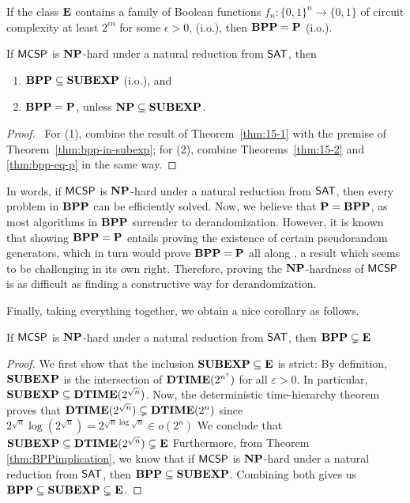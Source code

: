 \documentclass[11pt]{article}
\begin{document}
\begin{theorem}
  \label{thm:bpp-eq-p}
	If the class $\mathbf{E}$ contains a family of Boolean functions $f_n: \{0, 1\}^n \rightarrow \{0, 1\}$ of circuit complexity at least $2^{\epsilon n}$ for some $\epsilon > 0$, (i.o.), then $\mathbf{BPP} = \mathbf{P}$ (i.o.).
\end{theorem}

\begin{theorem}[\cite{10.1145/335305.335314}]
	\label{thm:BPPimplication}
	If $\mathsf{MCSP}$ is $\mathbf{NP}$-hard under a natural reduction from $\mathsf{SAT}$, then
	\begin{enumerate} [1.]
		\item $\mathbf{BPP} \subseteq \mathbf{SUBEXP}$ (i.o.), and
		\item $\mathbf{BPP} = \mathbf{P}$, unless $\mathbf{NP} \subseteq \mathbf{SUBEXP}$.
	\end{enumerate}
\end{theorem}

\begin{proof} \
  For (1), combine the result of Theorem~\ref{thm:15-1} with the premise of
  Theorem~\ref{thm:bpp-in-subexp};
  for (2), combine Theorems~\ref{thm:15-2} and \ref{thm:bpp-eq-p} in the same
  way.
\end{proof}

In words, if $\mathsf{MCSP}$ is $\mathbf{NP}$-hard under a natural reduction from
$\mathsf{SAT}$, then every problem in $\mathbf{BPP}$ can be efficiently solved.
Now, we believe that $\mathbf{P} = \mathbf{BPP}$, as most algorithms in $\mathbf{BPP}$ surrender
to derandomization.
However, it is known that showing $\mathbf{BPP} = \mathbf{P}$ entails proving the existence
of certain pseudorandom generators, which in turn would prove $\mathbf{BPP} = \mathbf{P}$ all
along \cite{goldreich11},
a result which seems to be challenging in its own right.
Therefore, proving the $\mathbf{NP}$-hardness of $\mathsf{MCSP}$ is as difficult
as finding a constructive way for derandomization.

Finally, taking everything together, we obtain a nice corollary as follows.

\begin{corollary}
	If $\mathsf{MCSP}$ is $\mathbf{NP}$-hard under a natural reduction from $\mathsf{SAT}$, then $\mathbf{BPP} \subsetneq \mathbf{E}$
\end{corollary}

\begin{proof}
  We first show that the inclusion $\mathbf{SUBEXP} \subseteq \mathbf{E}$ is
  strict:
  By definition, $\mathbf{SUBEXP}$ is the intersection of
  $\mathbf{DTIME}(2^{n^\varepsilon})$ for all $\varepsilon > 0$.
  In particular, $\mathbf{SUBEXP} \subseteq \mathbf{DTIME}(2^{\sqrt n})$.
  Now, the deterministic time-hierarchy theorem proves that
  $\mathbf{DTIME}(2^{\sqrt n}) \subsetneq \mathbf{DTIME}(2^{n})$ since
  $2^{\sqrt n} \log(2^{\sqrt n}) = 2^{\sqrt n \log \sqrt n}
   \in o(2^n)$
  We conclude that
  $\mathbf{SUBEXP} \subseteq \mathbf{DTIME}(2^{\sqrt n}) \subsetneq \mathbf{E}$
  Furthermore, from Theorem \ref{thm:BPPimplication}, we know that if
  $\mathsf{MCSP}$ is
  $\mathbf{NP}$-hard under a natural reduction from $\mathsf{SAT}$, then
  $\mathbf{BPP} \subseteq \mathbf{SUBEXP}$.
  Combining both gives us
  $\mathbf{BPP} \subseteq \mathbf{SUBEXP} \subsetneq \mathbf{E}$.
\end{proof}
\end{document}
